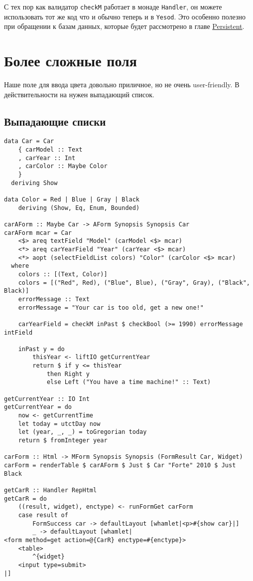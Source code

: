 \begin{remark}
С тех пор как валидатор \lstinline'checkM' работает в монаде \lstinline'Handler', он
можете использовать тот же код что и обычно теперь и в \lstinline'Yesod'. Это особенно
полезно при обращении к базам данных, которые будет рассмотрено в главе
\hyperref[ch:persistent]{Persistent}.
\end{remark}

\section{Более сложные поля}
Наше поле для ввода цвета довольно приличное, но не очень user-friendly. В
действительности на нужен выпадающий список.

\subsection{Выпадающие списки}

\begin{lstlisting}
data Car = Car
    { carModel :: Text
    , carYear :: Int
    , carColor :: Maybe Color
    }
  deriving Show

data Color = Red | Blue | Gray | Black
    deriving (Show, Eq, Enum, Bounded)

carAForm :: Maybe Car -> AForm Synopsis Synopsis Car
carAForm mcar = Car
    <$> areq textField "Model" (carModel <$> mcar)
    <*> areq carYearField "Year" (carYear <$> mcar)
    <*> aopt (selectFieldList colors) "Color" (carColor <$> mcar)
  where
    colors :: [(Text, Color)]
    colors = [("Red", Red), ("Blue", Blue), ("Gray", Gray), ("Black", Black)]
    errorMessage :: Text
    errorMessage = "Your car is too old, get a new one!"

    carYearField = checkM inPast $ checkBool (>= 1990) errorMessage intField

    inPast y = do
        thisYear <- liftIO getCurrentYear
        return $ if y <= thisYear
            then Right y
            else Left ("You have a time machine!" :: Text)

getCurrentYear :: IO Int
getCurrentYear = do
    now <- getCurrentTime
    let today = utctDay now
    let (year, _, _) = toGregorian today
    return $ fromInteger year

carForm :: Html -> MForm Synopsis Synopsis (FormResult Car, Widget)
carForm = renderTable $ carAForm $ Just $ Car "Forte" 2010 $ Just Black

getCarR :: Handler RepHtml
getCarR = do
    ((result, widget), enctype) <- runFormGet carForm
    case result of
        FormSuccess car -> defaultLayout [whamlet|<p>#{show car}|]
        _ -> defaultLayout [whamlet|
<form method=get action=@{CarR} enctype=#{enctype}>
    <table>
        ^{widget}
    <input type=submit>
|]
\end{lstlisting}

